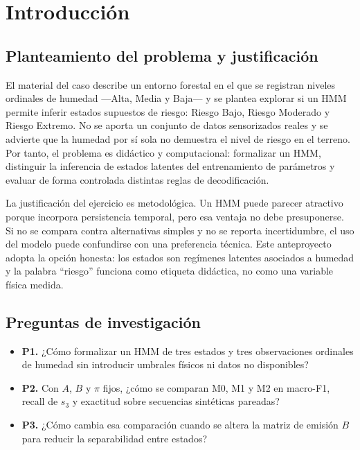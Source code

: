 \documentclass[11pt,a4paper]{article}
\begin{document}
\section{Introducción}

\subsection{Planteamiento del problema y justificación}

El material del caso describe un entorno forestal en el que se registran niveles ordinales de humedad ---Alta, Media y Baja--- y se plantea explorar si un HMM permite inferir estados supuestos de riesgo: Riesgo Bajo, Riesgo Moderado y Riesgo Extremo. No se aporta un conjunto de datos sensorizados reales y se advierte que la humedad por sí sola no demuestra el nivel de riesgo en el terreno. Por tanto, el problema es didáctico y computacional: formalizar un HMM, distinguir la inferencia de estados latentes del entrenamiento de parámetros y evaluar de forma controlada distintas reglas de decodificación.

La justificación del ejercicio es metodológica. Un HMM puede parecer atractivo porque incorpora persistencia temporal, pero esa ventaja no debe presuponerse. Si no se compara contra alternativas simples y no se reporta incertidumbre, el uso del modelo puede confundirse con una preferencia técnica. Este anteproyecto adopta la opción honesta: los estados son regímenes latentes asociados a humedad y la palabra ``riesgo'' funciona como etiqueta didáctica, no como una variable física medida.

\subsection{Preguntas de investigación}

\begin{itemize}
  \item \textbf{P1.} ¿Cómo formalizar un HMM de tres estados y tres observaciones ordinales de humedad sin introducir umbrales físicos ni datos no disponibles?
  \item \textbf{P2.} Con \(A\), \(B\) y \(\pi\) fijos, ¿cómo se comparan M0, M1 y M2 en macro-F1, recall de \(s_3\) y exactitud sobre secuencias sintéticas pareadas?
  \item \textbf{P3.} ¿Cómo cambia esa comparación cuando se altera la matriz de emisión \(B\) para reducir la separabilidad entre estados?
\end{itemize}
\end{document}
